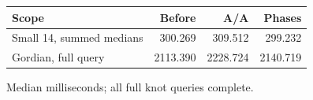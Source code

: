 \begin{center}\small
\begin{tabular}{@{}lrrr@{}}
\toprule
Scope & Before & A/A & Phases \\
\midrule
Small 14, summed medians & 300.269 & 309.512 & 299.232 \\
Gordian, full query & 2113.390 & 2228.724 & 2140.719 \\
\bottomrule
\end{tabular}
\end{center}
Median milliseconds; all full knot queries complete.
